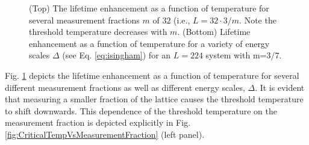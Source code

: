 \documentclass[twocolumn,superscriptaddress,aps,prb,floatfix]{revtex4-1}
\newcommand{\figref}[1]{Fig. \ref{#1}}
\begin{document}
\begin{figure}
\begin{center}
\end{center}
\caption[justification=raggedright]{
(Top) The lifetime enhancement as a function of temperature for several measurement fractions $m$ of $32$ (i.e., $L=32\cdot 3/m$.  Note the threshold temperature decreases  with $m$.
(Bottom) Lifetime enhancement as a function of temperature for a variety of energy scales $\Delta$ (see Eq. \ref{eq:isingham}) for an $L=224$ system with m=$3/7$.}
\label{fig:LifetimeVsMeasurementFractionVsDelta}
\end{figure}


\figref{fig:LifetimeVsMeasurementFractionVsDelta} depicts the lifetime enhancement as a function of temperature for several different measurement fractions as well as different energy scales, $\Delta$.  It is evident that measuring a smaller fraction of the lattice causes the threshold temperature to shift downwards.  This dependence of the threshold temperature on the measurement fraction is depicted explicitly in \figref{fig:CriticalTempVsMeasurementFraction} (left panel).
\end{document}
